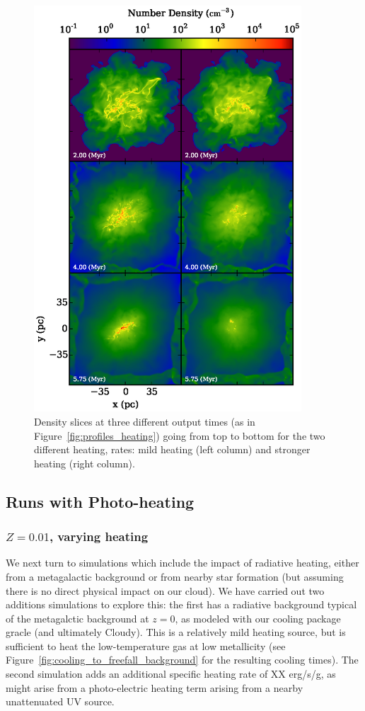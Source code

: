 \documentclass[useAMS,usenatbib]{mn2e}
\begin{document}
\begin{figure}
\begin{center}
\includegraphics[width=10cm]{Images/density_heating_panel}
\end{center}
\caption{\label{fig:density_heating}
Density slices at three different output times (as in Figure~\ref{fig:profiles_heating}) going
from top to bottom for the two different heating, rates: mild heating (left column) and
stronger heating (right column).
}
\end{figure}


\subsection{Runs with Photo-heating}

\subsubsection{$Z = 0.01$, varying heating}

We next turn to simulations which include the impact of radiative heating, either from a metagalactic background or from nearby star formation (but assuming there is no direct physical impact on our cloud).  We have carried out two additions simulations to explore this: the first has a radiative background typical of the \citet{Haardt2012} metagalctic background at $z=0$, as modeled with our cooling package {\sc gracle} (and ultimately Cloudy).  This is a relatively mild heating source, but is sufficient to heat the low-temperature gas at low metallicity (see Figure~\ref{fig:cooling_to_freefall_background} for the resulting cooling times).  The second simulation adds an additional specific heating rate of XX erg/s/g, as might arise from a photo-electric heating term arising from a nearby unattenuated UV source.
\end{document}
